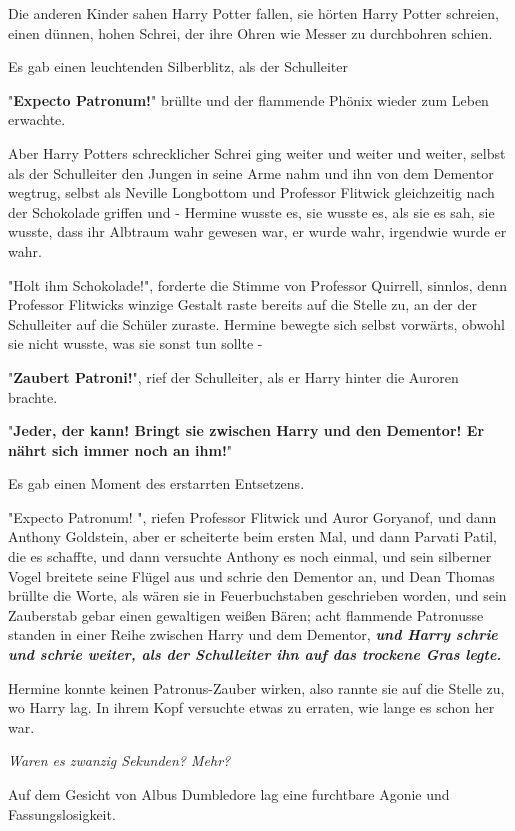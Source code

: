 {Die anderen Kinder sahen Harry Potter fallen, sie hörten Harry Potter schreien, einen dünnen, hohen Schrei, der ihre Ohren wie Messer zu durchbohren schien.

Es gab einen leuchtenden Silberblitz, als der Schulleiter

"\textbf{Expecto Patronum!}" brüllte und der flammende Phönix wieder zum Leben erwachte.

Aber Harry Potters schrecklicher Schrei ging weiter und weiter und weiter, selbst als der Schulleiter den Jungen in seine Arme nahm und ihn von dem Dementor wegtrug, selbst als Neville Longbottom und Professor Flitwick gleichzeitig nach der Schokolade griffen und - Hermine wusste es, sie wusste es, als sie es sah, sie wusste, dass ihr Albtraum wahr gewesen war, er wurde wahr, irgendwie wurde er wahr.

"Holt ihm Schokolade!", forderte die Stimme von Professor Quirrell, sinnlos, denn Professor Flitwicks winzige Gestalt raste bereits auf die Stelle zu, an der der Schulleiter auf die Schüler zuraste. Hermine bewegte sich selbst vorwärts, obwohl sie nicht wusste, was sie sonst tun sollte -

"\textbf{Zaubert Patroni!}", rief der Schulleiter, als er Harry hinter die Auroren brachte.

"\textbf{Jeder, der kann! Bringt sie zwischen Harry und den Dementor! Er nährt sich immer noch an ihm!}"

Es gab einen Moment des erstarrten Entsetzens.

"Expecto Patronum! ", riefen Professor Flitwick und Auror Goryanof, und dann Anthony Goldstein, aber er scheiterte beim ersten Mal, und dann Parvati Patil, die es schaffte, und dann versuchte Anthony es noch einmal, und sein silberner Vogel breitete seine Flügel aus und schrie den Dementor an, und Dean Thomas brüllte die Worte, als wären sie in Feuerbuchstaben geschrieben worden, und sein Zauberstab gebar einen gewaltigen weißen Bären; acht flammende Patronusse standen in einer Reihe zwischen Harry und dem Dementor, \textbf{\emph{und Harry schrie und schrie weiter, als der Schulleiter ihn auf das trockene Gras legte.}}

Hermine konnte keinen Patronus-Zauber wirken, also rannte sie auf die Stelle zu, wo Harry lag. In ihrem Kopf versuchte etwas zu erraten, wie lange es schon her war.

\emph{Waren es zwanzig Sekunden? Mehr?}

Auf dem Gesicht von Albus Dumbledore lag eine furchtbare Agonie und Fassungslosigkeit.

}
